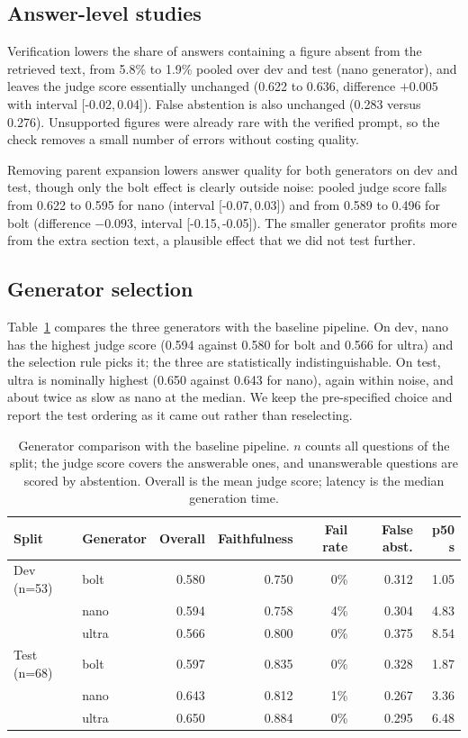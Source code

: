 \documentclass[11pt,a4paper]{article}
\newcommand{\ci}[2]{[#1,\,#2]}
\begin{document}
\subsection{Answer-level studies}
Verification lowers the share of answers containing a figure absent from the retrieved text, from 5.8\% to 1.9\% pooled over dev and test (nano generator), and leaves the judge score essentially unchanged (0.622 to 0.636, difference $+0.005$ with interval \ci{-0.02}{0.04}). False abstention is also unchanged (0.283 versus 0.276). Unsupported figures were already rare with the verified prompt, so the check removes a small number of errors without costing quality.

Removing parent expansion lowers answer quality for both generators on dev and test, though only the bolt effect is clearly outside noise: pooled judge score falls from 0.622 to 0.595 for nano (interval \ci{-0.07}{0.03}) and from 0.589 to 0.496 for bolt (difference $-0.093$, interval \ci{-0.15}{-0.05}). The smaller generator profits more from the extra section text, a plausible effect that we did not test further.

\subsection{Generator selection}\label{sec:gen}
Table~\ref{tab:gen} compares the three generators with the baseline pipeline. On dev, nano has the highest judge score (0.594 against 0.580 for bolt and 0.566 for ultra) and the selection rule picks it; the three are statistically indistinguishable. On test, ultra is nominally highest (0.650 against 0.643 for nano), again within noise, and about twice as slow as nano at the median. We keep the pre-specified choice and report the test ordering as it came out rather than reselecting.

\begin{table}[t]
\centering
\caption{Generator comparison with the baseline pipeline. $n$ counts all questions of the split; the judge score covers the answerable ones, and unanswerable questions are scored by abstention. Overall is the mean judge score; latency is the median generation time.}
\label{tab:gen}
\small
\begin{tabular}{llrrrrr}
\toprule
Split & Generator & Overall & Faithfulness & Fail rate & False abst. & p50 s \\
\midrule
Dev (n=53) & bolt & 0.580 & 0.750 & 0\% & 0.312 & 1.05 \\
 & nano & 0.594 & 0.758 & 4\% & 0.304 & 4.83 \\
 & ultra & 0.566 & 0.800 & 0\% & 0.375 & 8.54 \\
\midrule
Test (n=68) & bolt & 0.597 & 0.835 & 0\% & 0.328 & 1.87 \\
 & nano & 0.643 & 0.812 & 1\% & 0.267 & 3.36 \\
 & ultra & 0.650 & 0.884 & 0\% & 0.295 & 6.48 \\
\bottomrule
\end{tabular}
\end{table}
\end{document}
